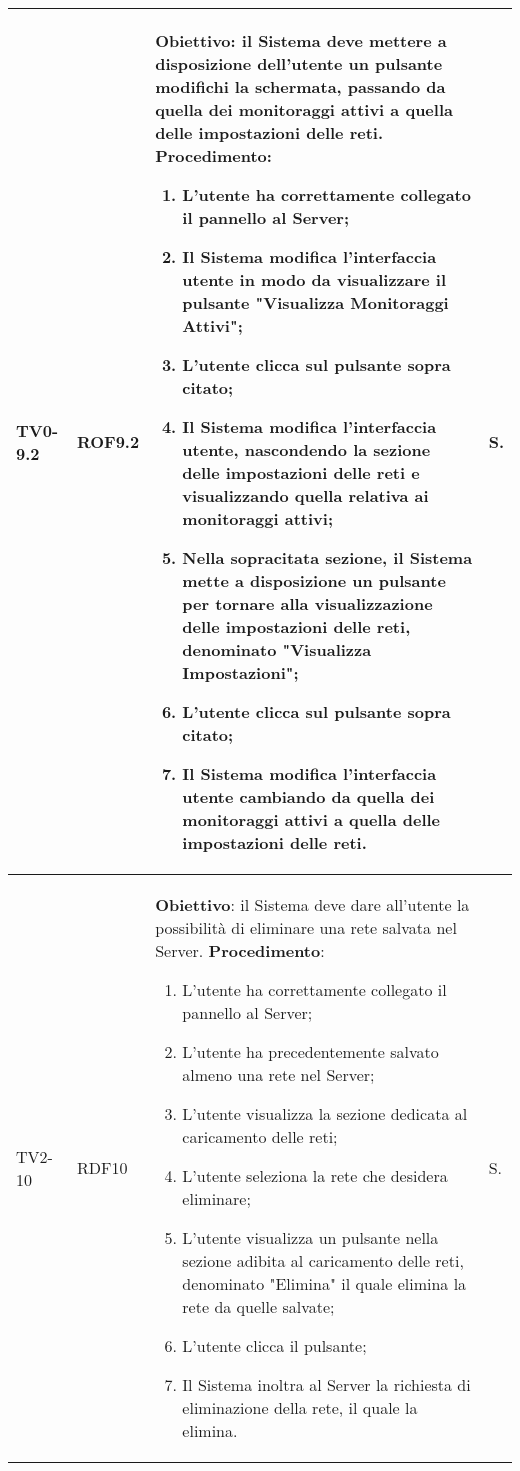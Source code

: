 \begin{longtable}{|C{.15\textwidth}|C{.13\textwidth}|m{.65\textwidth}|C{.08\textwidth}|}
TV0-9.2 & ROF9.2 &
	\textbf{Obiettivo}: il Sistema deve mettere a disposizione dell'utente un pulsante modifichi la schermata, passando da quella dei monitoraggi attivi a quella delle impostazioni delle reti. \newline
	\textbf{Procedimento}:
	\begin{enumerate}
		\item L'utente ha correttamente collegato il pannello al Server;
		\item Il Sistema modifica l'interfaccia utente in modo da visualizzare il pulsante "Visualizza Monitoraggi Attivi";
		\item L'utente clicca sul pulsante sopra citato;
		\item Il Sistema modifica l'interfaccia utente, nascondendo la sezione delle impostazioni delle reti e visualizzando quella relativa ai monitoraggi attivi;
		\item Nella sopracitata sezione, il Sistema mette a disposizione un pulsante per tornare alla visualizzazione delle impostazioni delle reti, denominato "Visualizza Impostazioni";
		\item L'utente clicca sul pulsante sopra citato;
		\item Il Sistema modifica l'interfaccia utente cambiando da quella dei monitoraggi attivi a quella delle impostazioni delle reti.
	\end{enumerate}
	& S. \\
\hline

TV2-10 & RDF10 &
	\textbf{Obiettivo}: il Sistema deve dare all'utente la possibilità di eliminare una rete salvata nel Server. \newline
	\textbf{Procedimento}:
	\begin{enumerate}
		\item L'utente ha correttamente collegato il pannello al Server;
		\item L'utente ha precedentemente salvato almeno una rete nel Server;
		\item L'utente visualizza la sezione dedicata al caricamento delle reti;
		\item L'utente seleziona la rete che desidera eliminare;
		\item L'utente visualizza un pulsante nella sezione adibita al caricamento delle reti, denominato "Elimina" il quale elimina la rete da quelle salvate;
		\item L'utente clicca il pulsante;
		\item Il Sistema inoltra al Server la richiesta di eliminazione della rete, il quale la elimina.
	\end{enumerate}
	& S. \\
\hline



\end{longtable}
